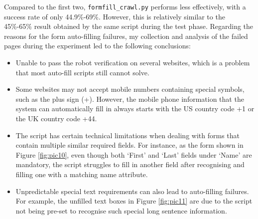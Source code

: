 \documentclass[ oneside,%
                    author={Cassie Qing Tang},
                    degree={BSc},
                     title={An Automated Response System for Disrupting Online Pet Scamming \\ },
                    subtitle={ }]{dissertation}
\begin{document}
Compared to the first two, \texttt{formfill\_crawl.py} performs less effectively, with a success rate of only 44.9\%-69\%. However, this is relatively similar to the 45\%-65\% result obtained by the same script during the test phase. Regarding the reasons for the form auto-filling failures, my collection and analysis of the failed pages during the experiment led to the following conclusions:
\begin{itemize}
  \item Unable to pass the robot verification on several websites, which is a problem that most auto-fill scripts still cannot solve.
  \item Some websites may not accept mobile numbers containing special symbols, such as the plus sign (+). However, the mobile phone information that the system can automatically fill in always starts with the US country code +1 or the UK country code +44.
  \item The script has certain technical limitations when dealing with forms that contain multiple similar required fields. For instance, as the form shown in Figure \ref{fig:pic10}, even though both `First' and `Last' fields under `Name' are mandatory, the script struggles to fill in another field after recognising and filling one with a matching name attribute.
  \item Unpredictable special text requirements can also lead to auto-filling failures. For example, the unfilled text boxes in Figure \ref{fig:pic11} are due to the script not being pre-set to recognise such special long sentence information.
\end{itemize}
\end{document}
